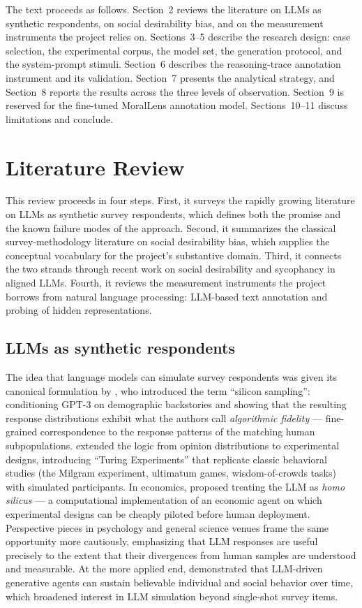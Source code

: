 \documentclass[14pt,a4paper]{extarticle}
\begin{document}
The text proceeds as follows. Section~2 reviews the literature on LLMs as synthetic respondents, on social desirability bias, and on the measurement instruments the project relies on. Sections~3--5 describe the research design: case selection, the experimental corpus, the model set, the generation protocol, and the system-prompt stimuli. Section~6 describes the reasoning-trace annotation instrument and its validation. Section~7 presents the analytical strategy, and Section~8 reports the results across the three levels of observation. Section~9 is reserved for the fine-tuned MoralLens annotation model. Sections~10--11 discuss limitations and conclude.

\section{Literature Review}

This review proceeds in four steps. First, it surveys the rapidly growing literature on LLMs as synthetic survey respondents, which defines both the promise and the known failure modes of the approach. Second, it summarizes the classical survey-methodology literature on social desirability bias, which supplies the conceptual vocabulary for the project's substantive domain. Third, it connects the two strands through recent work on social desirability and sycophancy in aligned LLMs. Fourth, it reviews the measurement instruments the project borrows from natural language processing: LLM-based text annotation and probing of hidden representations.

\subsection{LLMs as synthetic respondents}

The idea that language models can simulate survey respondents was given its canonical formulation by \cite{argyle2023}, who introduced the term ``silicon sampling'': conditioning GPT-3 on demographic backstories and showing that the resulting response distributions exhibit what the authors call \emph{algorithmic fidelity} --- fine-grained correspondence to the response patterns of the matching human subpopulations. \cite{aher2023} extended the logic from opinion distributions to experimental designs, introducing ``Turing Experiments'' that replicate classic behavioral studies (the Milgram experiment, ultimatum games, wisdom-of-crowds tasks) with simulated participants. In economics, \cite{horton2023} proposed treating the LLM as \emph{homo silicus} --- a computational implementation of an economic agent on which experimental designs can be cheaply piloted before human deployment. Perspective pieces in psychology and general science venues \cite{dillion2023, grossmann2023} frame the same opportunity more cautiously, emphasizing that LLM responses are useful precisely to the extent that their divergences from human samples are understood and measurable. At the more applied end, \cite{park2023} demonstrated that LLM-driven generative agents can sustain believable individual and social behavior over time, which broadened interest in LLM simulation beyond single-shot survey items.
\end{document}
